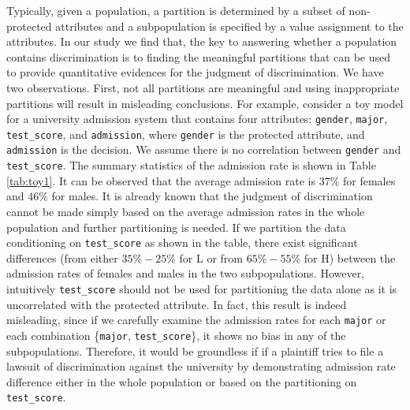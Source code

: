 \documentclass[twoside,leqno,twocolumn]{article}
\begin{document}

Typically, given a population, a partition is determined by a subset of non-protected attributes and a subpopulation is specified by a value assignment to the attributes. In our study we find that, the key to answering whether a population contains discrimination is to finding the meaningful partitions that can be used to provide quantitative evidences for the judgment of discrimination. We have two observations. First, not all partitions are meaningful and using inappropriate partitions will result in misleading conclusions. For example, consider a toy model for a university admission system that contains four attributes: \texttt{gender}, \texttt{major}, \texttt{test\_score}, and \texttt{admission}, where \texttt{gender} is the protected attribute, and \texttt{admission} is the decision. We assume there is no correlation between \texttt{gender} and \texttt{test\_score}. The summary statistics of the admission rate is shown in Table \ref{tab:toy1}. It can be observed that the average admission rate is $37\%$ for females and $46\%$ for males. It is already known that the judgment of discrimination cannot be made simply based on the average admission rates in the whole population and further partitioning is needed. If we partition the data conditioning on \texttt{test\_score} as shown in the table, there exist significant differences (from either $35\%-25\%$ for L or from $65\%-55\%$ for H) between the admission rates of females and males in the two subpopulations. However, intuitively \texttt{test\_score} should not be used for partitioning the data alone as it is uncorrelated with the protected attribute. In fact, this result is indeed misleading, since if we carefully examine the admission rates for each \texttt{major} or each combination \{\texttt{major}, \texttt{test\_score}\}, it shows no bias in any of the subpopulations. Therefore, it would be groundless if if a plaintiff tries to file a lawsuit of discrimination against the university by demonstrating admission rate difference either in the whole population or based on the partitioning on \texttt{test\_score}. 
\end{document}
